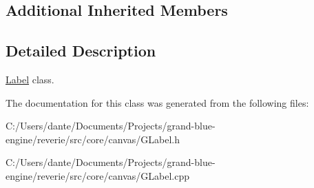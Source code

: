 \subsection*{Additional Inherited Members}


\subsection{Detailed Description}
\mbox{\hyperlink{classrev_1_1_label}{Label}} class. 

The documentation for this class was generated from the following files\+:\begin{DoxyCompactItemize}
\item 
C\+:/\+Users/dante/\+Documents/\+Projects/grand-\/blue-\/engine/reverie/src/core/canvas/G\+Label.\+h\item 
C\+:/\+Users/dante/\+Documents/\+Projects/grand-\/blue-\/engine/reverie/src/core/canvas/G\+Label.\+cpp\end{DoxyCompactItemize}
